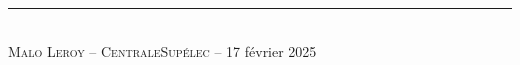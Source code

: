 \documentclass[a4paper, notitlepage]{report}
\begin{document}
\newcommand{\HRule}{\rule{\linewidth}{0.5mm}}



\thispagestyle{empty}


\thispagestyle{empty}
\setcounter{page}{0}


\renewcommand{\arraystretch}{1.5}


~
\thispagestyle{empty}
\setcounter{page}{0}
\newpage



\newpage



\newpage



\newpage



\newpage

\renewcommand{\thepage}{}

\printbibliography

\HRule \\[0.4cm]
\hfill{} \textsc{Malo \textsc{Leroy}} -- \textsc{CentraleSupélec} -- 17 février 2025
\end{document}
